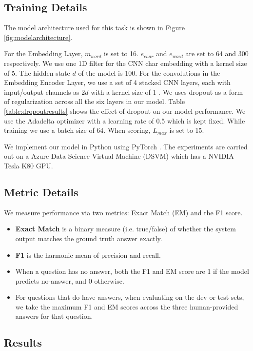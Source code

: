 \subsection{Training Details}
\label{subsec:trainingdetails}

The model architecture used for this task is shown in Figure \ref{fig:modelarchitecture}. 

For the Embedding Layer, $m_{word}$ is set to 16. ${e_{char}}$ and ${e_{word}}$ are set to 64 and 300 respectively. We use one 1D filter for the CNN char embedding with a kernel size of 5. The hidden state $d$ of the model is 100. For the convolutions in the Embedding Encoder Layer, we use a set of 4 stacked CNN layers, each with input/output channels as $2d$ with a kernel size of 1 . We uses dropout as a form of regularization across all the six layers in our model. Table \ref{table:dropoutresults} shows the effect of dropout on our model performance. We use the Adadelta optimizer \cite{zeiler2012adadelta} with a learning rate of 0.5 which is kept fixed. While training we use a batch size of 64. When scoring, $L_{max}$ is set to 15.

We implement our model in Python using PyTorch \cite{pytorch}. The experiments are carried out on a Azure Data Science Virtual Machine (DSVM) \cite{dsvm} which has a NVIDIA Tesla K80 GPU.

\subsection{Metric Details}
\label{subsec:metricdetails}

We measure performance via two metrics: Exact Match (EM) and the F1 score.

\begin{itemize}
\item \textbf{Exact Match} is a binary measure (i.e. true/false) of whether the system output matches the ground truth answer exactly.
\item \textbf{F1} is the harmonic mean of precision and recall.
\item When a question has no answer, both the F1 and EM score are 1 if the model predicts no-answer, and 0 otherwise.
\item For questions that do have answers, when evaluating on the dev or test sets, we take the maximum F1 and EM scores across the three human-provided answers for that question.
\end{itemize}

\subsection{Results}
\label{subsec:results}

